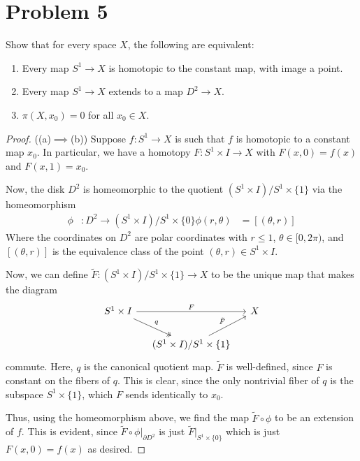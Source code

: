 \documentclass[fontsize=11pt]{scrartcl} %
\numberwithin{equation}{section} %
\numberwithin{figure}{section} %
\numberwithin{table}{section} %
\begin{document}
\section*{Problem 5}
Show that for every space $X$, the following are equivalent:
\begin{enumerate}[label=(\alph*)]
    \item Every map $S^1\to X$ is homotopic to the constant map, with image a
        point.
    \item Every map $S^1\to X$ extends to a map $D^2\to X$.
    \item $\pi(X,x_0) = 0$ for all $x_0\in X$.
\end{enumerate}

\begin{proof}
    ((a)$\implies$(b))
    Suppose $f:S^1\to X$ is such that $f$ is homotopic to a constant map $x_0$.
    In particular, we have a homotopy $F:S^1\times I\to X$ with $F(x,0) = f(x)$
    and $F(x,1)=x_0$.

    Now, the disk $D^2$ is homeomorphic to the quotient $(S^1\times I)/{S^1\times
    \{1\}}$ via the homeomorphism 
    \[
        \begin{aligned}
            \phi&:D^2\to (S^1\times I)/{S^1\times\{0\}}
            \phi(r,\theta) &= [(\theta,r)]
        \end{aligned}
    \]
    Where the coordinates on $D^2$ are polar coordinates with $r \leq 1$,
    $\theta\in[0,2\pi)$, and $[(\theta,r)]$ is the equivalence class of the
    point $(\theta,r)\in S^1\times I$.

    Now, we can define $\tilde{F}:(S^1\times I)/{S^1\times \{1\}}\to X$ to be the
    unique map that makes the diagram
    \[
        \begin{tikzcd}[column sep=small]
            S^1\times I\arrow{rr}{F}\arrow[two heads]{rd}{q} &&X\\
            & (S^1\times I)/{S^1\times\{1\}}\arrow{ur}{\tilde{F}}
        \end{tikzcd}
    \]
    commute. Here, $q$ is the canonical quotient map. $\tilde{F}$ is
    well-defined, since $F$ is constant on the fibers of $q$. This is clear,
    since the only nontrivial fiber of $q$ is the subspace $S^1\times\{1\}$,
    which $F$ sends identically to $x_0$.

    Thus, using the homeomorphism above, we find the map $\tilde{F}\circ\phi$ to
    be an extension of $f$. This is evident, since
    $\tilde{F}\circ\phi|_{\partial D^2}$ is just $\tilde{F}|_{S^1\times\{0\}}$
    which is just $F(x,0)=f(x)$ as desired.


\end{proof}
\end{document}
